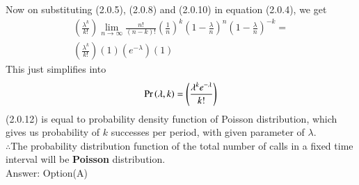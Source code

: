 \documentclass[journal,12pt,twocolumn]{IEEEtran}
\begin{document}
Now on substituting (2.0.5), (2.0.8) and (2.0.10) in equation (2.0.4), we get
\begin{multline}  
    \left(\frac{\lambda^k}{k!}\right)\lim_{n \to \infty}\frac{n!}{(n-k)!}\left(\frac{1}{n}\right)^k\left(1-\frac{\lambda}{n}\right)^n\left(1-\frac{\lambda}{n}\right)^{-k}=\\
    \left(\frac{\lambda^k}{k!}\right)(1)\left(e^{-\lambda}\right)(1)
\end{multline}
This just simplifies into
\begin{align}
    \Pr\left(\lambda,k\right)=\left(\frac{\lambda^k e^{-\lambda}}{k!}\right)
\end{align}
   (2.0.12) is equal to probability density function of Poisson distribution, which gives us probability of $k$ successes per period, with given parameter of $\lambda$.\\
   
   $\therefore $The probability distribution function of the total
number of calls in a fixed time interval will be \textbf{Poisson} distribution.\\
Answer: Option(A)
\end{document}
